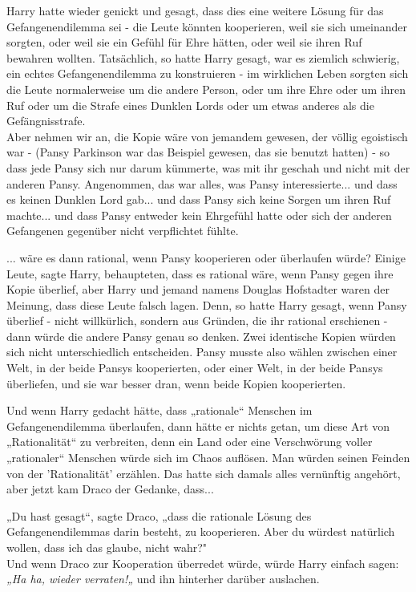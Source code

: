 {Harry hatte wieder genickt und gesagt, dass dies eine weitere Lösung für das Gefangenendilemma sei - die Leute könnten kooperieren, weil sie sich umeinander sorgten, oder weil sie ein Gefühl für Ehre hätten, oder weil sie ihren Ruf bewahren wollten. Tatsächlich, so hatte Harry gesagt, war es ziemlich schwierig, ein echtes Gefangenendilemma zu konstruieren - im wirklichen Leben sorgten sich die Leute normalerweise um die andere Person, oder um ihre Ehre oder um ihren Ruf oder um die Strafe eines Dunklen Lords oder um etwas anderes als die Gefängnisstrafe.\\ Aber nehmen wir an, die Kopie wäre von jemandem gewesen, der völlig egoistisch war - (Pansy Parkinson war das Beispiel gewesen, das sie benutzt hatten) - so dass jede Pansy sich nur darum kümmerte, was mit ihr geschah und nicht mit der anderen Pansy. Angenommen, das war alles, was Pansy interessierte... und dass es keinen Dunklen Lord gab... und dass Pansy sich keine Sorgen um ihren Ruf machte... und dass Pansy entweder kein Ehrgefühl hatte oder sich der anderen Gefangenen gegenüber nicht verpflichtet fühlte.

... wäre es dann rational, wenn Pansy kooperieren oder überlaufen würde? Einige Leute, sagte Harry, behaupteten, dass es rational wäre, wenn Pansy gegen ihre Kopie überlief, aber Harry und jemand namens Douglas Hofstadter waren der Meinung, dass diese Leute falsch lagen. Denn, so hatte Harry gesagt, wenn Pansy überlief - nicht willkürlich, sondern aus Gründen, die ihr rational erschienen - dann würde die andere Pansy genau so denken. Zwei identische Kopien würden sich nicht unterschiedlich entscheiden. Pansy musste also wählen zwischen einer Welt, in der beide Pansys kooperierten, oder einer Welt, in der beide Pansys überliefen, und sie war besser dran, wenn beide Kopien kooperierten.

Und wenn Harry gedacht hätte, dass „rationale“ Menschen im Gefangenendilemma überlaufen, dann hätte er nichts getan, um diese Art von „Rationalität“ zu verbreiten, denn ein Land oder eine Verschwörung voller „rationaler“ Menschen würde sich im Chaos auflösen. Man würden seinen Feinden von der 'Rationalität' erzählen. Das hatte sich damals alles vernünftig angehört, aber jetzt kam Draco der Gedanke, dass...

„Du hast gesagt“, sagte Draco, „dass die rationale Lösung des Gefangenendilemmas darin besteht, zu kooperieren. Aber du würdest natürlich wollen, dass ich das glaube, nicht wahr?"\\ Und wenn Draco zur Kooperation überredet würde, würde Harry einfach sagen:\\ \emph{„Ha ha, wieder verraten!„} und ihn hinterher darüber auslachen.

}
